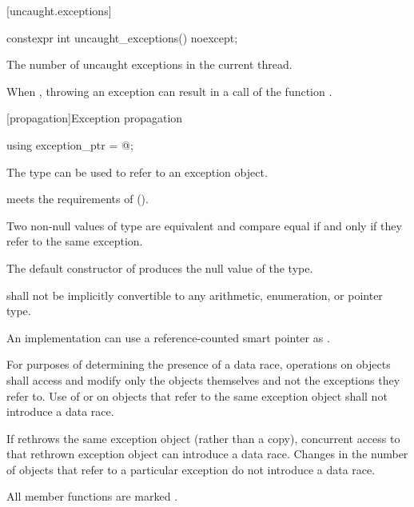 [uncaught.exceptions]{}

%
\begin{itemdecl}
constexpr int uncaught_exceptions() noexcept;
\end{itemdecl}

\begin{itemdescr}
\pnum
\returns
The number of uncaught exceptions in the current thread.

\pnum
\remarks
When ,
throwing an exception can result in a call of the function
.
\end{itemdescr}

[propagation]{Exception propagation}

%
\begin{itemdecl}
using exception_ptr = @\unspec@;
\end{itemdecl}

\begin{itemdescr}
\pnum
The type  can be used to refer to an exception object.

\pnum
{} meets the requirements of
 ().

\pnum
Two non-null values of type  are equivalent and compare equal if and
only if they refer to the same exception.

\pnum
The default constructor of  produces the null value of the
type.

\pnum
{} shall not be implicitly convertible to any arithmetic,
enumeration, or pointer type.

\pnum
\begin{note}
An implementation can use a reference-counted smart
pointer as .
\end{note}

\pnum
For purposes of determining the presence of a data race, operations on
 objects shall access and modify only the
 objects themselves and not the exceptions they refer to.
Use of  or 
on  objects that refer to
the same exception object shall not introduce a data race.
\begin{note}
If
 rethrows the same exception object (rather than a copy),
concurrent access to that rethrown exception object can introduce a data race.
Changes in the number of  objects that refer to a
particular exception do not introduce a data race.
\end{note}

\pnum
All member functions are marked .
\end{itemdescr}

